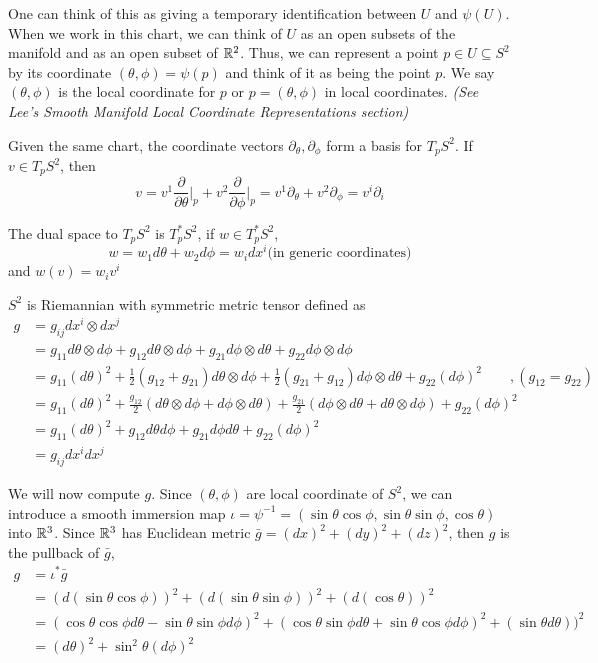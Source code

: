 \documentclass[12pt]{article}
\begin{document}
One can think of this as giving a temporary identification between $U$ and $\psi(U)$. When we work in this chart, we can think of $U$ as an open subsets of the manifold and as an open subset of $\mathbb{R}^2$. Thus, we can represent a point $p \in U \subseteq S^2$ by its coordinate $(\theta, \phi) = \psi(p)$ and think of it as being the point $p$. We say $(\theta, \phi)$ is the local coordinate for $p$ or $p = (\theta, \phi)$ in local coordinates. \textit{(See Lee's Smooth Manifold Local Coordinate Representations section)}

Given the same chart, the coordinate vectors $\partial_\theta, \partial_\phi$ form a basis for $T_pS^2$. If $v \in T_pS^2$, then  $$v = v^1 \frac{\partial}{\partial \theta}\bigg\rvert_p + v^2 \frac{\partial}{\partial \phi}\bigg\rvert_p = v^1\partial_\theta + v^2 \partial_\phi = v^i \partial_i $$

The dual space to $T_pS^2$ is $T^*_pS^2$, if $w \in T^*_pS^2$, $$w = w_1 d\theta + w_2 d\phi = w_i dx^i \text{(in generic coordinates)}$$
and $w(v) = w_i v^i$

$S^2$ is Riemannian with symmetric metric tensor defined as 
$$
\begin{aligned}
	g &= g_{ij}dx^i \otimes dx^j  \\
	  &= g_{11}d\theta\otimes d\phi + g_{12}d\theta \otimes d\phi + g_{21}d\phi \otimes d\theta + g_{22} d\phi \otimes d\phi \\
	  &= g_{11}(d\theta)^2 + \frac{1}{2}(g_{12} + g_{21}) d\theta \otimes d\phi +  \frac{1}{2}(g_{21} + g_{12})  d\phi\otimes d\theta +  g_{22} (d\phi)^2 \qquad ,(g_{12} = g_{22}) \\
	  &= g_{11}(d\theta)^2 + \frac{g_{12}}{2}(d\theta \otimes d\phi + d\phi\otimes d\theta) + \frac{g_{21}}{2}(d\phi\otimes d\theta + d\theta \otimes d\phi) + g_{22} (d\phi)^2 \\
	  &= g_{11}(d\theta)^2 + g_{12}d\theta d\phi + g_{21}d\phi d\theta + g_{22} (d\phi)^2 \\
	  &= g_{ij}dx^i dx^j
\end{aligned}$$

We will now compute $g$. Since $(\theta, \phi)$ are local coordinate of $S^2$, we can introduce a smooth immersion map $\iota = \psi^{-1} = (\sin\theta \cos\phi, \sin\theta\sin\phi, \cos\theta)$ into $\mathbb{R}^3$. Since $\mathbb{R}^3$ has Euclidean metric $\bar{g} = (dx)^2 + (dy)^2 + (dz)^2$, then $g$ is the pullback of $\bar{g}$,
$$\begin{aligned} 
	g &= \iota^*\bar{g} \\
	  &= (d(\sin\theta \cos\phi))^2 + (d(\sin\theta\sin\phi))^2 + (d(\cos\theta))^2\\
	  &= (\cos\theta \cos\phi d\theta - \sin\theta \sin\phi d\phi)^2 + (\cos\theta\sin\phi d\theta + \sin\theta\cos\phi d\phi)^2 + (\sin\theta d\theta))^2\\
	  &= (d\theta)^2 + \sin^2\theta (d\phi)^2
\end{aligned} 
$$
\end{document}
